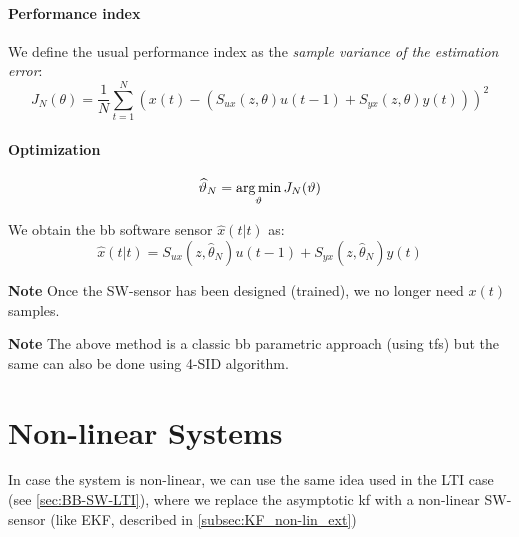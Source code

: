\paragraph{Performance index}
We define the usual performance index as the \emph{sample variance of the estimation error}: 
\[
    J_N(\theta) = \frac{1}{N}\sum_{t=1}^N \left( x(t) - (S_{ux}(z, \theta) u(t-1) + S_{yx}(z,\theta)y(t)) \right)^2
\]

\paragraph{Optimization}
\[
    \widehat{\vartheta}_N = \operatorname*{arg\,min}_\vartheta J_N(\vartheta)
\]

We obtain the \acrlong{bb} software sensor $\hat{x}(t|t)$ as: 
\[
	\hat{x}(t|t) = S_{ux}(z, \hat{\theta}_N) u(t-1) + S_{yx}(z,\hat{\theta}_N)y(t)
\]


\textbf{Note} Once the SW-sensor has been designed (trained), we no longer need $x(t)$ samples.

\textbf{Note} The above method is a classic \gls{bb} parametric approach (using \gls{tf}s) but the same can also be done using 4-SID algorithm.


\section{Non-linear Systems}

In case the system is non-linear, we can use the same idea used in the LTI case (see \ref{sec:BB-SW-LTI}), where we replace the asymptotic \gls{kf} with a non-linear SW-sensor (like EKF, described in \ref{subsec:KF_non-lin_ext})

\begin{figure}[H]
    \centering
\end{figure}

